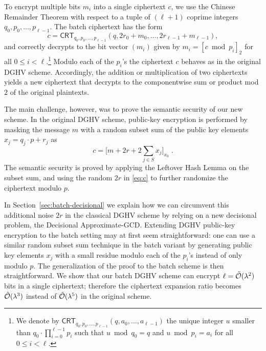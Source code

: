 \documentclass[11pt]{llncs}
\renewcommand\leq\leqslant
\newcommand{\Ot}[1]{{\cal \tilde O}(#1)}
\newcommand*{\crt}{\ensuremath{\mathsf{CRT}}}
\begin{document}
To encrypt multiple bits $m_i$ into a single
ciphertext $c$, we use the Chinese Remainder
Theorem with respect to a tuple of $(\ell+1)$ coprime integers $q_0,p_0,\ldots,p_{\ell-1}$. The batch ciphertext has the form
\[ c = \crt_{q_0,p_0,\ldots,p_{\ell-1}}(q, 2r_0+m_0,\ldots,2r_{\ell-1}+m_{\ell-1}), \]
and correctly decrypts to the bit vector $(m_i)$ given by $m_i=[c \bmod p_i]_2$ for all $0 \leq i < \ell$.\footnote{We denote by 
$\crt_{q_0,p_0,\ldots,p_{\ell-1}}(q,a_0,\ldots,a_{\ell-1})$ the unique
  integer $u$ smaller than $q_0\cdot\prod_{i=0}^{\ell-1} p_i$ such that $u\bmod q_0=q$ and $u\bmod p_i=a_i$ for
  all $0 \leq i < \ell$.} Modulo each of the $p_i$'s the
ciphertext $c$ behaves as in the original DGHV scheme. Accordingly, the
addition or multiplication of two ciphertexts yields a new ciphertext
that decrypts to the componentwise sum or product mod $2$ of the original
plaintexts.

The main challenge, however, was to prove the semantic security of our new scheme. In the original DGHV scheme, public-key encryption is
performed by masking the message $m$ with a random subset sum of the
public key elements $x_j=q_j \cdot p + r_j$ as
\begin{equation}
\label{eq:c}
c = \bigg[ m+2r+2 \sum\limits_{j \in S} x_j \bigg]_{x_0}\;.
\end{equation}
The semantic security is proved by applying the Leftover Hash Lemma on
the subset sum, and using the random $2r$ in \eqref{eq:c} to further
randomize the ciphertext modulo $p$.

In Section~\ref{sec:batch-decisional} we explain how we can circumvent this
additional noise $2r$ in the classical DGHV scheme by relying on a new
decisional problem, the Decisional Approximate-GCD. Extending DGHV public-key
encryption to the batch setting may at first seem straightforward: one can use
a similar random subset sum technique in the batch variant by generating
public key elements $x_j$ with a small residue modulo each of the $p_i$'s
instead of only modulo $p$. The generalization of the proof to the batch
scheme is then straightforward. We show that our batch DGHV scheme
can encrypt $\ell=\Ot{\lambda^2}$ bits in a single ciphertext; therefore
the ciphertext expansion ratio becomes $\Ot{\lambda^3}$ instead of
$\Ot{\lambda^5}$ in the original scheme.
\end{document}
